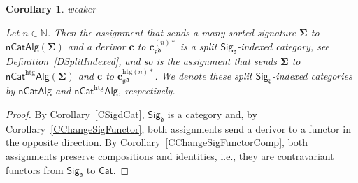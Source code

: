 \documentclass[a4paper, reqno]{amsbook}
\makeatletter
\newcommand{\sig}[1]{\mathbf{#1}}             %
\newcommand{\gd}{\mathfrak{gd}}              %
\newcommand{\htg}{\mathrm{htg}}                %
\theoremstyle{plain}
\newtheorem{corollary}[theorem]{Corollary}
\theoremstyle{definition}
\newcommand*{\CA@leanpending}{}
\newcommand*{\CA@leanrelation}{}
\newcommand*{\lean}[2]{%
  \ifcsname\string\color@lean@#1\endcsname\else
    \PackageError{main}{Unknown relation `#1' in \string\lean}{Use equivalent, weaker or stronger.}%
  \fi
  \gdef\CA@leanrelation{#1}%
  \gdef\CA@leanpending{#2}}
\makeatother
\begin{document}
\begin{corollary}\label{CChangeSigIndexed}\lean{weaker}{ChangeOfSignature.homogeneousIndexed,ChangeOfSignature.heterogeneousIndexed,ChangeOfSignature.homogeneousFunctorReductIso,ChangeOfSignature.heterogeneousFunctorReductIso}
Let $n\in\mathbb{N}$.
Then the assignment that sends a many-sorted signature $\sig{\Sigma}$ to $\mathsf{nCatAlg}(\sig{\Sigma})$ and a derivor $\mathbf{c}$ to $\mathbf{c}^{(n)\ast}_{\gd}$ is a split $\mathsf{Sig}_{\mathfrak{d}}$-indexed category, see Definition~\ref{DSplitIndexed}, and so is the assignment that sends $\sig{\Sigma}$ to $\mathsf{nCat}^{\htg}\mathsf{Alg}(\sig{\Sigma})$ and $\mathbf{c}$ to $\mathbf{c}^{\htg(n)\ast}_{\gd}$.
We denote these split $\mathsf{Sig}_{\mathfrak{d}}$-indexed categories by $\mathsf{nCatAlg}$ and $\mathsf{nCat}^{\htg}\mathsf{Alg}$, respectively.
\end{corollary}
\begin{proof}
By Corollary~\ref{CSigdCat}, $\mathsf{Sig}_{\mathfrak{d}}$ is a category and, by Corollary~\ref{CChangeSigFunctor}, both assignments send a derivor to a functor in the opposite direction.
By Corollary~\ref{CChangeSigFunctorComp}, both assignments preserve compositions and identities, i.e., they are contravariant functors from $\mathsf{Sig}_{\mathfrak{d}}$ to $\mathsf{Cat}$.
\end{proof}
\end{document}
